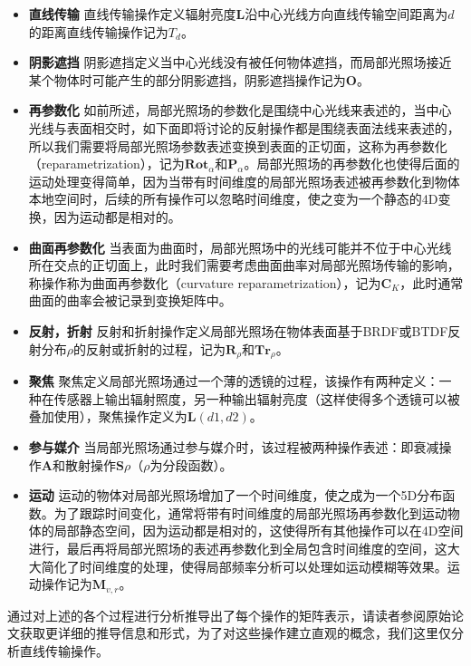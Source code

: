 \begin{itemize}
	\item \textbf{直线传输 } 直线传输操作定义辐射亮度$\mathbf{L}$沿中心光线方向直线传输空间距离为$d$的距离直线传输操作记为$T_d$。
	\item \textbf{阴影遮挡 } 阴影遮挡定义当中心光线没有被任何物体遮挡，而局部光照场接近某个物体时可能产生的部分阴影遮挡，阴影遮挡操作记为$\mathbf{O}$。
	\item \textbf{再参数化 } 如前所述，局部光照场的参数化是围绕中心光线来表述的，当中心光线与表面相交时，如下面即将讨论的反射操作都是围绕表面法线来表述的，所以我们需要将局部光照场参数表述变换到表面的正切面，这称为再参数化（reparametrization），记为$\mathbf{Rot}_\alpha$和$\mathbf{P}_\alpha$。局部光照场的再参数化也使得后面的运动处理变得简单，因为当带有时间维度的局部光照场表述被再参数化到物体本地空间时，后续的所有操作可以忽略时间维度，使之变为一个静态的4D变换，因为运动都是相对的。
	\item \textbf{曲面再参数化 } 当表面为曲面时，局部光照场中的光线可能并不位于中心光线所在交点的正切面上，此时我们需要考虑曲面曲率对局部光照场传输的影响，称操作称为曲面再参数化（curvature reparametrization），记为$\mathbf{C}_K$，此时通常曲面的曲率会被记录到变换矩阵中。
	\item \textbf{反射，折射 } 反射和折射操作定义局部光照场在物体表面基于BRDF或BTDF反射分布$\rho$的反射或折射的过程，记为$\mathbf{R}_\rho$和$\mathbf{Tr}_\rho$。
	\item \textbf{聚焦 } 聚焦定义局部光照场通过一个薄的透镜的过程，该操作有两种定义：一种在传感器上输出辐射照度，另一种输出辐射亮度（这样使得多个透镜可以被叠加使用），聚焦操作定义为$\mathbf{L}(d1,d2)$。
	\item \textbf{参与媒介 } 当局部光照场通过参与媒介时，该过程被两种操作表述：即衰减操作$\mathbf{A}$和散射操作$\mathbf{S}\rho$（$\rho$为分段函数）。
	\item \textbf{运动 } 运动的物体对局部光照场增加了一个时间维度，使之成为一个5D分布函数。为了跟踪时间变化，通常将带有时间维度的局部光照场再参数化到运动物体的局部静态空间，因为运动都是相对的，这使得所有其他操作可以在4D空间进行，最后再将局部光照场的表述再参数化到全局包含时间维度的空间，这大大简化了时间维度的处理，使得局部频率分析可以处理如运动模糊等效果。运动操作记为$\mathbf{M}_{v,r}$。
\end{itemize}

\cite{a:AFrequencyAnalysisofLightTransportfromtheorytoimplementation}通过对上述的各个过程进行分析推导出了每个操作的矩阵表示，请读者参阅原始论文获取更详细的推导信息和形式，为了对这些操作建立直观的概念，我们这里仅分析直线传输操作。


